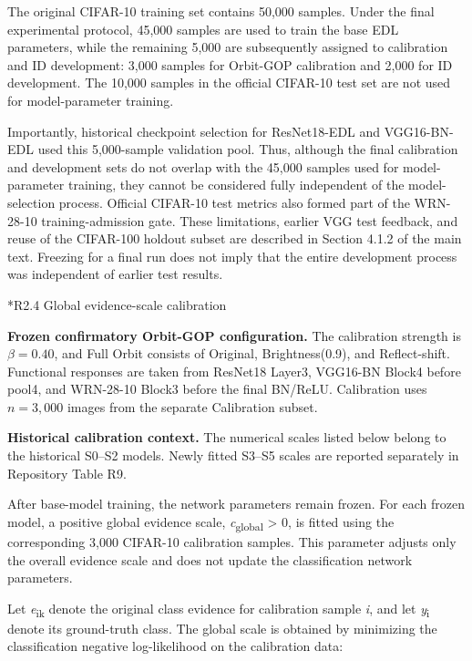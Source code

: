 \documentclass[11pt,a4paper]{article}
\makeatletter
\renewcommand\subsection{\@startsection{subsection}{2}{\z@}{-1.8ex plus -.5ex minus -.2ex}{.7ex plus .2ex}{\normalfont\normalsize\bfseries\raggedright}}
\makeatother
\begin{document}
The original CIFAR-10 training set contains 50,000 samples. Under the final experimental protocol, 45,000 samples are used to train the base EDL parameters, while the remaining 5,000 are subsequently assigned to calibration and ID development: 3,000 samples for Orbit-GOP calibration and 2,000 for ID development. The 10,000 samples in the official CIFAR-10 test set are not used for model-parameter training.

Importantly, historical checkpoint selection for ResNet18-EDL and VGG16-BN-EDL used this 5,000-sample validation pool. Thus, although the final calibration and development sets do not overlap with the 45,000 samples used for model-parameter training, they cannot be considered fully independent of the model-selection process. Official CIFAR-10 test metrics also formed part of the WRN-28-10 training-admission gate. These limitations, earlier VGG test feedback, and reuse of the CIFAR-100 holdout subset are described in Section 4.1.2 of the main text. Freezing for a final run does not imply that the entire development process was independent of earlier test results.

\subsection*{R2.4 Global evidence-scale calibration}\label{s2.4-global-evidence-scale-calibration}

\noindent\textbf{Frozen confirmatory Orbit-GOP configuration.} The calibration strength is $\beta=0.40$, and Full Orbit consists of Original, Brightness(0.9), and Reflect-shift. Functional responses are taken from ResNet18 Layer3, VGG16-BN Block4 before pool4, and WRN-28-10 Block3 before the final BN/ReLU. Calibration uses $n=3{,}000$ images from the separate Calibration subset.

\noindent\textbf{Historical calibration context.} The numerical scales listed below belong to the historical S0--S2 models. Newly fitted S3--S5 scales are reported separately in Repository Table R9.

After base-model training, the network parameters remain frozen. For each frozen model, a positive global evidence scale, \emph{c}\textsubscript{global} \textgreater{} 0, is fitted using the corresponding 3,000 CIFAR-10 calibration samples. This parameter adjusts only the overall evidence scale and does not update the classification network parameters.

Let \emph{e}\textsubscript{ik} denote the original class evidence for calibration sample \emph{i}, and let \emph{y}\textsubscript{i} denote its ground-truth class. The global scale is obtained by minimizing the classification negative log-likelihood on the calibration data:
\end{document}
